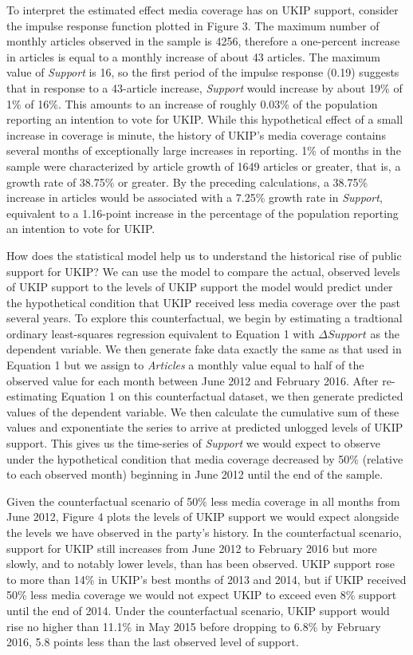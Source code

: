 \documentclass[12pt,]{article}
\begin{document}
To interpret the estimated effect media coverage has on UKIP support,
consider the impulse response function plotted in Figure 3. The maximum
number of monthly articles observed in the sample is 4256, therefore a
one-percent increase in articles is equal to a monthly increase of about
43 articles. The maximum value of \emph{Support} is 16, so the first
period of the impulse response (0.19) suggests that in response to a
43-article increase, \emph{Support} would increase by about 19\% of 1\%
of 16\%. This amounts to an increase of roughly 0.03\% of the population
reporting an intention to vote for UKIP. While this hypothetical effect
of a small increase in coverage is minute, the history of UKIP's media
coverage contains several months of exceptionally large increases in
reporting. 1\% of months in the sample were characterized by article
growth of 1649 articles or greater, that is, a growth rate of 38.75\% or
greater. By the preceding calculations, a 38.75\% increase in articles
would be associated with a 7.25\% growth rate in \emph{Support},
equivalent to a 1.16-point increase in the percentage of the population
reporting an intention to vote for UKIP.

How does the statistical model help us to understand the historical rise
of public support for UKIP? We can use the model to compare the actual,
observed levels of UKIP support to the levels of UKIP support the model
would predict under the hypothetical condition that UKIP received less
media coverage over the past several years. To explore this
counterfactual, we begin by estimating a tradtional ordinary
least-squares regression equivalent to Equation 1 with
\(\Delta Support\) as the dependent variable. We then generate fake data
exactly the same as that used in Equation 1 but we assign to
\emph{Articles} a monthly value equal to half of the observed value for
each month between June 2012 and February 2016. After re-estimating
Equation 1 on this counterfactual dataset, we then generate predicted
values of the dependent variable. We then calculate the cumulative sum
of these values and exponentiate the series to arrive at predicted
unlogged levels of UKIP support. This gives us the time-series of
\emph{Support} we would expect to observe under the hypothetical
condition that media coverage decreased by 50\% (relative to each
observed month) beginning in June 2012 until the end of the sample.

Given the counterfactual scenario of 50\% less media coverage in all
months from June 2012, Figure 4 plots the levels of UKIP support we
would expect alongside the levels we have observed in the party's
history. In the counterfactual scenario, support for UKIP still
increases from June 2012 to February 2016 but more slowly, and to
notably lower levels, than has been observed. UKIP support rose to more
than 14\% in UKIP's best months of 2013 and 2014, but if UKIP received
50\% less media coverage we would not expect UKIP to exceed even 8\%
support until the end of 2014. Under the counterfactual scenario, UKIP
support would rise no higher than 11.1\% in May 2015 before dropping to
6.8\% by February 2016, 5.8 points less than the last observed level of
support.
\end{document}
